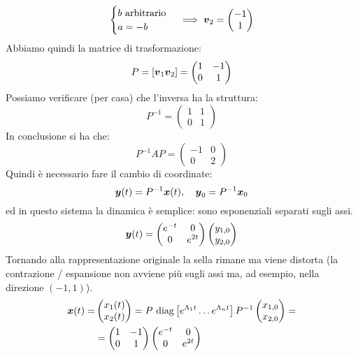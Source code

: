\begin{exmp}
\[          \begin{cases}
              b \text{ arbitrario}\\
	      a = -b
          \end{cases}
	  \implies 
	  \boldsymbol{v}_2 = \begin{pmatrix} -1 \\ 1 \end{pmatrix} 
      \] 
      Abbiamo quindi la matrice di trasformazione:
      \[
	  P = \left[\boldsymbol{v}_1\boldsymbol{v}_2\right] = \begin{pmatrix} 1 & -1 \\ 0 & 1 \end{pmatrix} 
      \] 
      Possiamo verificare (per casa) che l'inversa ha la struttura:
      \[
	  P^{-1} = \begin{pmatrix} 1 & 1 \\ 0 & 1 \end{pmatrix} 
      \] 
      In conclusione si ha che:
      \[
	  P^{-1}AP = \begin{pmatrix} -1 & 0 \\ 0 & 2 \end{pmatrix} 
      \] 
      Quindi è necessario fare il cambio di coordinate:
      \[
	  \boldsymbol{y} (t)=P^{-1}\boldsymbol{x} (t), \quad \boldsymbol{y }_0 = P^{-1}\boldsymbol{x}_0
      \] 
      ed in questo sistema la dinamica è semplice: sono esponenziali separati sugli assi.
      \[
	  \boldsymbol{y} (t)= \begin{pmatrix} e^{-t} & 0 \\ 0 & e^{2t} \end{pmatrix} \begin{pmatrix} y_{1, 0}\\y_{2, 0} \end{pmatrix} 
      \] 
      Tornando alla rappresentazione originale la sella rimane ma viene distorta (la contrazione / espansione non avviene più sugli assi ma, ad esempio, nella direzione $(-1, 1)$).
      \[\begin{aligned}
	  \vect{x} (t)=& \begin{pmatrix} x_1(t)\\ x_2(t) \end{pmatrix} = P \ \text{diag}\left[e^{\Lambda_1t}\ldots e^{\Lambda_nt}\right]
	  P^{-1}\begin{pmatrix}x_{1,0}\\ x_{2, 0}  \end{pmatrix} = \\
		       &= \begin{pmatrix} 1 & -1 \\ 0 & 1 \end{pmatrix} \begin{pmatrix} e^{-t} & 0 \\ 0 & e^{2t} \end{pmatrix} 

\end{aligned}\]
\end{exmp}
